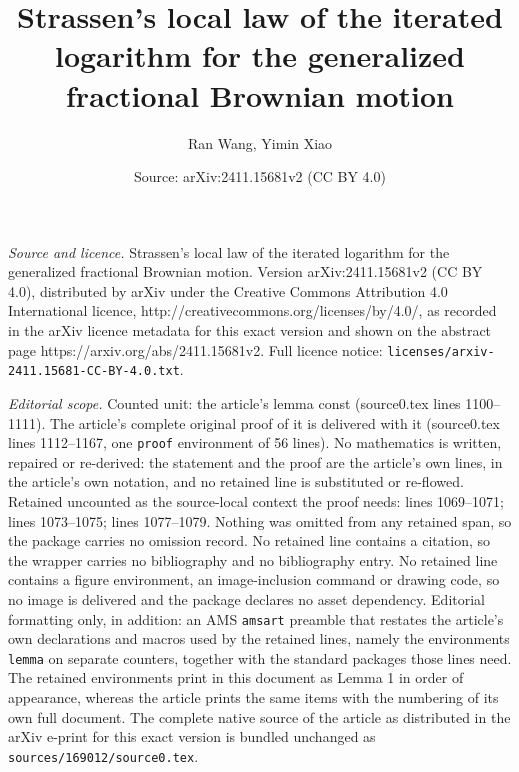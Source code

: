 \documentclass[10pt,a4paper]{amsart}
\title{Strassen's local law of the iterated logarithm for the generalized fractional Brownian motion}
\author{Ran Wang, Yimin Xiao}
\date{Source: arXiv:2411.15681v2 (CC BY 4.0)}
\begin{document}
\maketitle

\noindent\emph{Source and licence.} Strassen's local law of the iterated logarithm for the generalized fractional Brownian motion. Version arXiv:2411.15681v2 (CC BY 4.0), distributed by arXiv under the Creative Commons Attribution 4.0 International licence, http://creativecommons.org/licenses/by/4.0/, as recorded in the arXiv licence metadata for this exact version and shown on the abstract page https://arxiv.org/abs/2411.15681v2. Full licence notice: \texttt{licenses/arxiv-2411.15681-CC-BY-4.0.txt}.\par\smallskip

\noindent\textit{Editorial scope.} Counted unit: the article's lemma const (source0.tex lines 1100--1111). The article's complete original proof of it is delivered with it (source0.tex lines 1112--1167, one \texttt{proof} environment of 56 lines). No mathematics is written, repaired or re-derived: the statement and the proof are the article's own lines, in the article's own notation, and no retained line is substituted or re-flowed.  Retained uncounted as the source-local context the proof needs: lines 1069--1071; lines 1073--1075; lines 1077--1079.  Nothing was omitted from any retained span, so the package carries no omission record.  No retained line contains a citation, so the wrapper carries no bibliography and no bibliography entry.  No retained line contains a figure environment, an image-inclusion command or drawing code, so no image is delivered and the package declares no asset dependency.  Editorial formatting only, in addition: an AMS \texttt{amsart} preamble that restates the article's own declarations and macros used by the retained lines, namely the environments \texttt{lemma} on separate counters, together with the standard packages those lines need.  The retained environments print in this document as Lemma 1 in order of appearance, whereas the article prints the same items with the numbering of its own full document.  The complete native source of the article as distributed in the arXiv e-print for this exact version is bundled unchanged as \texttt{sources/169012/source0.tex}.
\end{document}

